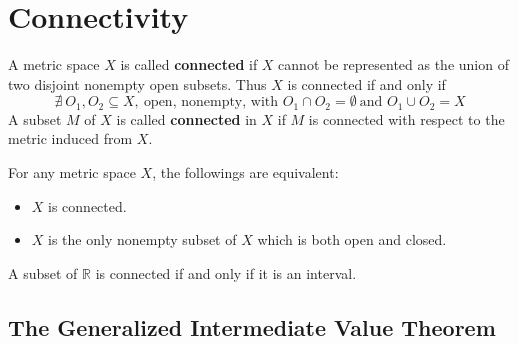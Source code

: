 \chapter{Connectivity}

\begin{definition}[connectedness]
    A metric space \(X\) is called \textbf{connected} if \(X\) cannot be represented as 
    the union of two disjoint nonempty open subsets. Thus \(X\) is connected if and only if 
    \[
        \nexists \: O_1, O_2 \subseteq X, \: \text{open, nonempty, with } O_1 \cap O_2 = \emptyset 
        \: \text{and } O_1 \cup O_2 = X     
    \]
    A subset \(M\) of \(X\) is called \textbf{connected} in \(X\) if \(M\) is connected 
    with respect to the metric induced from \(X\). 
\end{definition}


\begin{proposition}
    For any metric space \(X\), the followings are equivalent: 
    \begin{itemize}
        \item \(X\) is connected. 
        \item \(X\) is the only nonempty subset of \(X\) which is both open and closed. 
    \end{itemize}
\end{proposition}

\begin{theorem} 
    A subset of \(\mathbb{R}\) is connected if and only if it is an interval. 
\end{theorem}

\section{The Generalized Intermediate Value Theorem}

